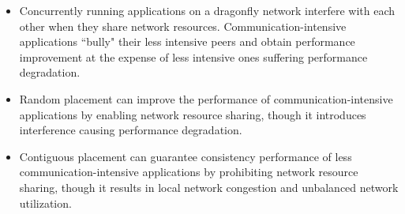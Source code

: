 


\begin{itemize}
   
    \item Concurrently running applications on a dragonfly network interfere with each other when they share network resources. Communication-intensive applications ``bully" their less intensive peers and obtain performance improvement at the expense of less intensive ones suffering performance degradation. 
    
    \item Random placement can improve the performance of communication-intensive applications by enabling network resource sharing, though it introduces interference causing performance degradation.
    
    \item Contiguous placement can guarantee consistency performance of less communication-intensive applications by prohibiting network resource sharing, though it results in local network congestion and unbalanced network utilization.
    
\end{itemize}

